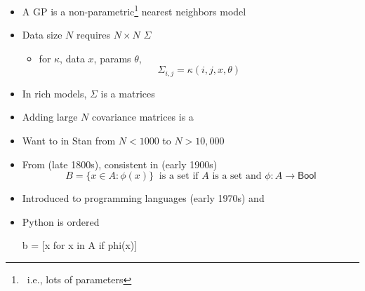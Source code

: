 \documentclass[10pt]{report}
\begin{document}

\begin{itemize}
\item A GP is a non-parametric\footnote{\sf \null \ i.e., lots of parameters} nearest neighbors model
\item Data size $N$ requires $N \times N$  $\Sigma$
  \begin{itemize}
  \item for  $\kappa$, data $x$, params $\theta$,
    \[
      \Sigma_{i,j} = \kappa(i, j, x, \theta)
    \]
  \end{itemize}
\item In rich models, $\Sigma$ is a  matrices
\item Adding large $N$ covariance matrices is a 
\item Want to  in Stan from $N < 1000$ to $N > 10,000$
\end{itemize}



\begin{itemize}
\item From  (late 1800s), consistent in  (early 1900s)
  \[
    B = \{ x \in A : \phi(x) \} \ \textrm{ is a set if } A \textrm{ is a
      set and } \phi : A \rightarrow \textsf{Bool}
  \]
\item Introduced to programming languages (early 1970s) and
\item Python  is ordered
\begin{stancode}
b = [x for x in A if phi(x)]
\end{stancode}
\end{itemize}
\end{document}
